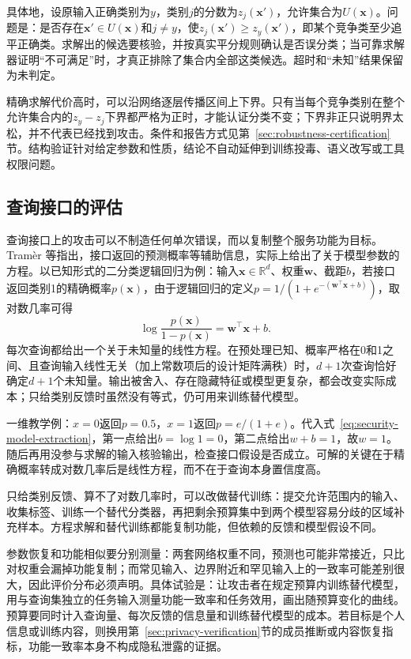 具体地，设原输入正确类别为$y$，类别$j$的分数为$z_j(\bm{x}')$，允许集合为$U(\bm{x})$。问题是：是否存在$\bm{x}'\in U(\bm{x})$和$j\ne y$，使$z_j(\bm{x}')\geq z_y(\bm{x}')$，即某个竞争类至少追平正确类。求解出的候选要核验，并按真实平分规则确认是否误分类；当可靠求解器证明“不可满足”时，才真正排除了集合内全部这类候选。超时和“未知”结果保留为未判定。

精确求解代价高时，可以沿网络逐层传播区间上下界。只有当每个竞争类别在整个允许集合内的$z_y-z_j$下界都严格为正时，才能认证分类不变；下界非正只说明界太松，并不代表已经找到攻击。条件和报告方式见第~\ref{sec:robustness-certification}节。结构验证针对给定参数和性质，结论不自动延伸到训练投毒、语义改写或工具权限问题。

\subsection{查询接口的评估}
\label{sec:security-information-test}

查询接口上的攻击可以不制造任何单次错误，而以复制整个服务功能为目标。Tramèr 等指出，接口返回的预测概率等辅助信息，实际上给出了关于模型参数的方程。以已知形式的二分类逻辑回归为例：输入$\bm x\in\mathbb R^d$、权重$\bm w$、截距$b$，若接口返回类别1的精确概率$p(\bm{x})$，由于逻辑回归的定义$p=1/(1+e^{-(\bm w^\top\bm x+b)})$，取对数几率可得
\begin{equation}
 \log\frac{p(\bm{x})}{1-p(\bm{x})}
 =\bm{w}^{\top}\bm{x}+b.
 \label{eq:security-model-extraction}
\end{equation}
每次查询都给出一个关于未知量的线性方程。在预处理已知、概率严格在0和1之间、且查询输入线性无关（加上常数项后的设计矩阵满秩）时，$d+1$次查询恰好确定$d+1$个未知量。输出被舍入、存在隐藏特征或模型更复杂，都会改变实际成本；只给类别反馈时虽然没有等式，仍可用来训练替代模型。

一维教学例：$x=0$返回$p=0.5$，$x=1$返回$p=e/(1+e)$。代入式~\eqref{eq:security-model-extraction}，第一点给出$b=\log1=0$，第二点给出$w+b=1$，故$w=1$。随后再用没参与求解的输入核验输出，检查接口假设是否成立。可解的关键在于精确概率转成对数几率后是线性方程，而不在于查询本身置信度高。

只给类别反馈、算不了对数几率时，可以改做替代训练：提交允许范围内的输入、收集标签、训练一个替代分类器，再把剩余预算集中到两个模型容易分歧的区域补充样本。方程求解和替代训练都能复制功能，但依赖的反馈和模型假设不同。

参数恢复和功能相似要分别测量：两套网络权重不同，预测也可能非常接近，只比对权重会漏掉功能复制；而常见输入、边界附近和罕见输入上的一致率可能差别很大，因此评价分布必须声明。具体试验是：让攻击者在规定预算内训练替代模型，用与查询集独立的任务输入测量功能一致率和任务效用，画出随预算变化的曲线。预算要同时计入查询量、每次反馈的信息量和训练替代模型的成本。若目标是个人信息或训练内容，则换用第~\ref{sec:privacy-verification}节的成员推断或内容恢复指标，功能一致率本身不构成隐私泄露的证据。

